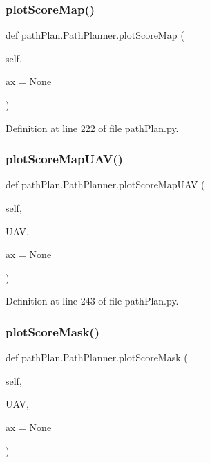 \subsubsection{\texorpdfstring{plot\+Score\+Map()}{plotScoreMap()}}
{\footnotesize\ttfamily def path\+Plan.\+Path\+Planner.\+plot\+Score\+Map (\begin{DoxyParamCaption}\item[{}]{self,  }\item[{}]{ax = {\ttfamily None} }\end{DoxyParamCaption})}



Definition at line 222 of file path\+Plan.\+py.

\mbox{\label{classpath_plan_1_1_path_planner_aa5506bc585bd5f1d3fa76d0e383b0cc2}} 
\subsubsection{\texorpdfstring{plot\+Score\+Map\+U\+A\+V()}{plotScoreMapUAV()}}
{\footnotesize\ttfamily def path\+Plan.\+Path\+Planner.\+plot\+Score\+Map\+U\+AV (\begin{DoxyParamCaption}\item[{}]{self,  }\item[{}]{U\+AV,  }\item[{}]{ax = {\ttfamily None} }\end{DoxyParamCaption})}



Definition at line 243 of file path\+Plan.\+py.

\mbox{\label{classpath_plan_1_1_path_planner_a6e74d35801d637631580333ea9210aa5}} 
\subsubsection{\texorpdfstring{plot\+Score\+Mask()}{plotScoreMask()}}
{\footnotesize\ttfamily def path\+Plan.\+Path\+Planner.\+plot\+Score\+Mask (\begin{DoxyParamCaption}\item[{}]{self,  }\item[{}]{U\+AV,  }\item[{}]{ax = {\ttfamily None} }\end{DoxyParamCaption})}



